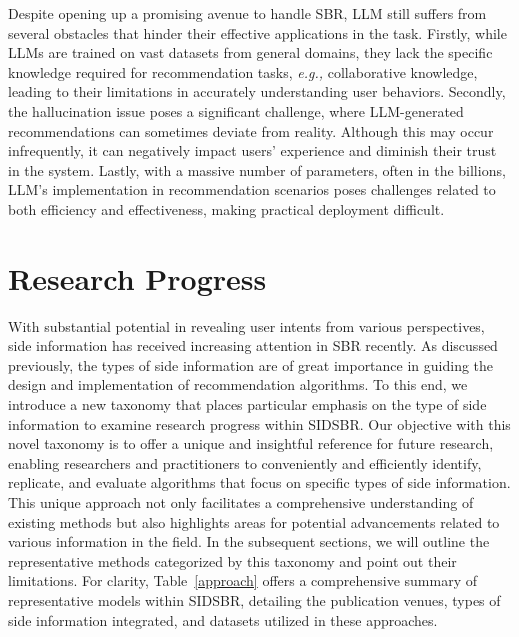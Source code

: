 \documentclass[lettersize,journal]{IEEEtran}
\newcommand{\eg}{\emph{e.g.,}\xspace}
\newcommand{\baby}{{SIDSBR}\xspace}
\begin{document}
Despite opening up a promising avenue to handle SBR, LLM still suffers from several obstacles that hinder their effective applications in the task. Firstly, while LLMs are trained on vast datasets from general domains, they lack the specific knowledge required for recommendation tasks, \eg collaborative knowledge, leading to their limitations in accurately understanding user behaviors. Secondly, the hallucination issue poses a significant challenge, where LLM-generated recommendations can sometimes deviate from reality. Although this may occur infrequently, it can negatively impact users' experience and diminish their trust in the system. Lastly, with a massive number of parameters, often in the billions, LLM's implementation in recommendation scenarios poses challenges related to both efficiency and effectiveness, making practical deployment difficult.






\section{Research Progress}\label{ResearchP}
With substantial potential in revealing user intents from various perspectives, side information has received increasing attention in SBR recently. As discussed previously, the types of side information are of great importance in guiding the design and implementation of recommendation algorithms. To this end, we introduce a new taxonomy that places particular emphasis on the type of side information to examine research progress within \baby. Our objective with this novel taxonomy is to offer a unique and insightful reference for future research, enabling researchers and practitioners to conveniently and efficiently identify, replicate, and evaluate algorithms that focus on specific types of side information. This unique approach not only facilitates a comprehensive understanding of existing methods but also highlights areas for potential advancements related to various information in the field. In the subsequent sections, we will outline the representative methods categorized by this taxonomy and point out their limitations. For clarity, Table~\ref{approach} offers a comprehensive summary of representative models within \baby, detailing the publication venues, types of side information integrated, and datasets utilized in these approaches.
\end{document}
